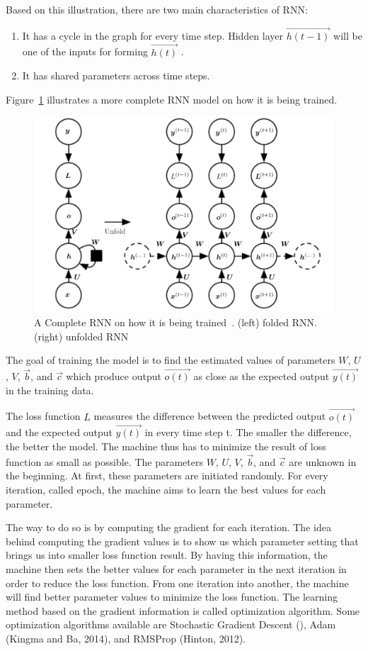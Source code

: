 Based on this illustration, there are two main characteristics of RNN:
\begin{enumerate}
	\item It has a cycle in the graph for every time step. Hidden layer $\vec{h(t-1)}$  will be one of the inputs for forming $\vec{h(t)}$ .
	\item It has shared parameters across time steps.
\end{enumerate}

Figure~\ref{fig:fulrnn} illustrates a more complete RNN model on how it is being trained.

\begin{figure}
	\centering
	\includegraphics[width=0.80\linewidth]{images/fullrnn}
	\caption{A Complete RNN on how it is being trained~\citep{Goodfellow-et-al-2016-Book}. (left) folded RNN. (right) unfolded RNN}
	\label{fig:fulrnn}
\end{figure}

The goal of training the model is to find the estimated values of parameters $W$, $U$, $V$, $\vec{b}$, and $\vec{c}$ which produce output $\vec{o(t)}$ as close as the expected output $\vec{y(t)}$ in the training data. 

The loss function $L$ measures the difference between the predicted output $\vec{o(t)}$ and the expected output $\vec{y(t)}$ in every time step t. The smaller the difference, the better the model. The machine thus has to minimize the result of loss function as small as possible. The parameters $W$, $U$, $V$, $\vec{b}$, and $\vec{c}$ are unknown in the beginning. At first, these parameters are initiated randomly. For every iteration, called epoch, the machine aims to learn the best values for each parameter.

The way to do so is by computing the gradient for each iteration. The idea behind computing the gradient values is to show us which parameter setting that brings us into smaller loss function result. By having this information, the machine then sets the better values for each parameter in the next iteration in order to reduce the loss function. From one iteration into another, the machine will find better parameter values to minimize the loss function. The learning method based on the gradient information is called optimization algorithm. Some optimization algorithms available are Stochastic Gradient Descent (), Adam (Kingma and Ba, 2014), and RMSProp (Hinton, 2012).

